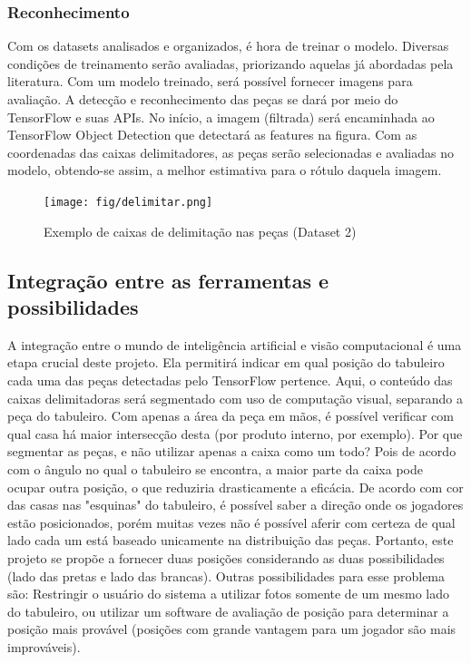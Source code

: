 \documentclass[a4paper,12pt,twoside]{article}
\begin{document}
\subsubsection{Reconhecimento}

Com os datasets analisados e organizados, é hora de treinar o modelo.
Diversas condições de treinamento serão avaliadas, priorizando aquelas já abordadas pela literatura.
Com um modelo treinado, será possível fornecer imagens para avaliação.
A detecção e reconhecimento das peças se dará por meio do TensorFlow e suas APIs. No início, a imagem (filtrada) será encaminhada ao TensorFlow Object Detection que detectará as features na figura.
Com as coordenadas das caixas delimitadores, as peças serão selecionadas e avaliadas no modelo, obtendo-se assim, a melhor estimativa para o rótulo daquela imagem.

\begin{figure}[h!]
\centering
  \texttt{[image: fig/delimitar.png]}
  \caption{Exemplo de caixas de delimitação nas peças (Dataset 2)}
\label{fig:delimitar}
\end{figure}

\subsection{Integração entre as ferramentas e possibilidades}

A integração entre o mundo de inteligência artificial e visão computacional é uma etapa crucial deste projeto.
Ela permitirá indicar em qual posição do tabuleiro cada uma das peças detectadas pelo TensorFlow pertence.
Aqui, o conteúdo das caixas delimitadoras será segmentado com uso de computação visual, separando a peça do tabuleiro.
Com apenas a área da peça em mãos, é possível verificar com qual casa há maior intersecção desta (por produto interno, por exemplo).
Por que segmentar as peças, e não utilizar apenas a caixa como um todo? Pois de acordo com o ângulo no qual o tabuleiro se encontra, a maior parte da caixa pode ocupar outra posição, o que reduziria drasticamente a eficácia.
De acordo com cor das casas nas "esquinas" do tabuleiro, é possível saber a direção onde os jogadores estão posicionados, porém muitas vezes não é possível aferir com certeza de qual lado cada um está baseado unicamente na distribuição das peças.
Portanto, este projeto se propõe a fornecer duas posições considerando as duas possibilidades (lado das pretas e lado das brancas).
Outras possibilidades para esse problema são: Restringir o usuário do sistema a utilizar fotos somente de um mesmo lado do tabuleiro, ou utilizar um software de avaliação de posição para determinar a posição mais provável (posições com grande vantagem para um jogador são mais improváveis).
\end{document}
